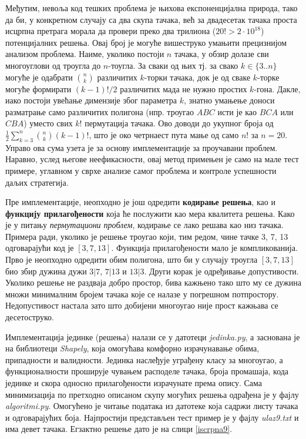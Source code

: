 \documentclass[a4paper]{article}
\begin{document}
Међутим, невоља код тешких проблема је њихова експоненцијална природа, тако да би, у конкретном случају са два скупа тачака, већ за двадесетак тачака проста исцрпна претрага морала да провери преко два трилиона ($20! > 2\cdot10^{18}$) потенцијалних решења. Овај број је могуће вишеструко умањити прецизнијом анализом проблема. Наиме, уколико постоји $n$ тачака, у обзир долазе сви многоуглови од троугла до $n$-тоугла. За сваки од њих тј. за свако $k \in \{3..n\}$ могуће је одабрати ${n \choose k}$ различитих $k$-торки тачака, док је од сваке $k$-торке могуће формирати $(k-1)!/2$ различитих мада не нужно простих $k$-гона. Дакле, иако постоји увећање димензије због параметра $k$, знатно умањење доноси разматрање само различитих полигона (нпр. троугао $ABC$ исти је као $BCA$ или $CBA$) уместо свих $k!$ пермутација тачака. Ово доводи до укупног броја од $\frac{1}{2} \sum_{k=3}^{n} {n \choose k} (k-1)!$, што је око четрнаест пута мање од само $n!$ за $n = 20$. Управо ова сума узета је за основу имплементације за проучавани проблем. Наравно, услед његове неефикасности, овај метод примењен је само на мале тест примере, углавном у сврхе анализе самог проблема и контроле успешности даљих стратегија.

Пре имплементације, неопходно је још одредити \textbf{кодирање решења}, као и \textbf{функцију прилагођености} која ће послужити као мера квалитета решења. Како је у питању \textit{пермутациони проблем}, кодирање се лако решава као низ тачака. Примера ради, уколико је решење троугао који, тим редом, чине тачке 3, 7, 13 одговарајући код је $[3, 7, 13]$. Функција прилагођености мало је компликованија. Прво је неопходно одредити обим полигона, што би у случају троугла $[3, 7, 13]$ био збир дужина дужи $3|7$, $7|13$ и $13|3$. Други корак је одређивање допустивости. Уколико решење не раздваја добро простор, бива кажњено тако што му се дужина множи минималним бројем тачака које се налазе у погрешном потпростору. Недопустивост настала зато што добијени многоугао није прост кажњава се десетоструко.

Имплементација јединке (решења) налази се у датотеци \textit{jedinka.py}, а заснована је на библиотеци \textit{Shapely}, која омогућава комфорно израчунавање обима, припадности и валидности. Јединка наслеђује уграђену класу за многоугао, а функционалности проширује чувањем расподеле тачака, броја промашаја, кода јединке и скора односно прилагођености израчунате према опису. Сама минимизација по претходно описаном скупу могућих решења одрађена је у фајлу \textit{algoritmi.py}. Омогућено је читање података из датотеке која садржи листу тачака и одговарајућих боја. Најпростији представљен тест пример је у фајлу \textit{ulaz9.txt} и има девет тачака. Егзактно решење дато је на слици \ref{iscrpna9}.
\end{document}

